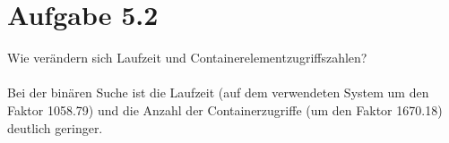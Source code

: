 \documentclass{article}
\begin{document}
\section*{Aufgabe 5.2}
Wie ver\"andern sich Laufzeit und Containerelementzugriffszahlen?\\
\\
Bei der bin\"aren Suche ist die Laufzeit (auf dem verwendeten System um den Faktor 1058.79) und die Anzahl der Containerzugriffe (um den Faktor 1670.18) deutlich geringer.
\end{document}
